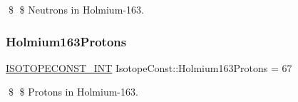 \$ \$ Neutrons in Holmium-\/163. \mbox{\label{group___isotope_const-_holmium-_ho163_ga25b363aca6dc8c0ca83f71aaba56dc26}} 
\subsubsection{\texorpdfstring{Holmium163\+Protons}{Holmium163Protons}}
{\footnotesize\ttfamily \mbox{\hyperlink{group___isotope_const-_macros_ga5f18360b3e99483a35c32d789e62621c}{I\+S\+O\+T\+O\+P\+E\+C\+O\+N\+S\+T\+\_\+\+I\+NT}} Isotope\+Const\+::\+Holmium163\+Protons = 67}

\$ \$ Protons in Holmium-\/163. 